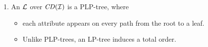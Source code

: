 {
  \begin{enumerate}
    \item An  $\mathcal{L}$ over $\mathit{CD}(\mathcal{I})$ is a PLP-tree, where
    \begin{itemize}
      \item each attribute appears  on every path from the root to a leaf.
			\item Unlike PLP-trees, an LP-tree induces a total order.
    \end{itemize}
  \end{enumerate}
}
